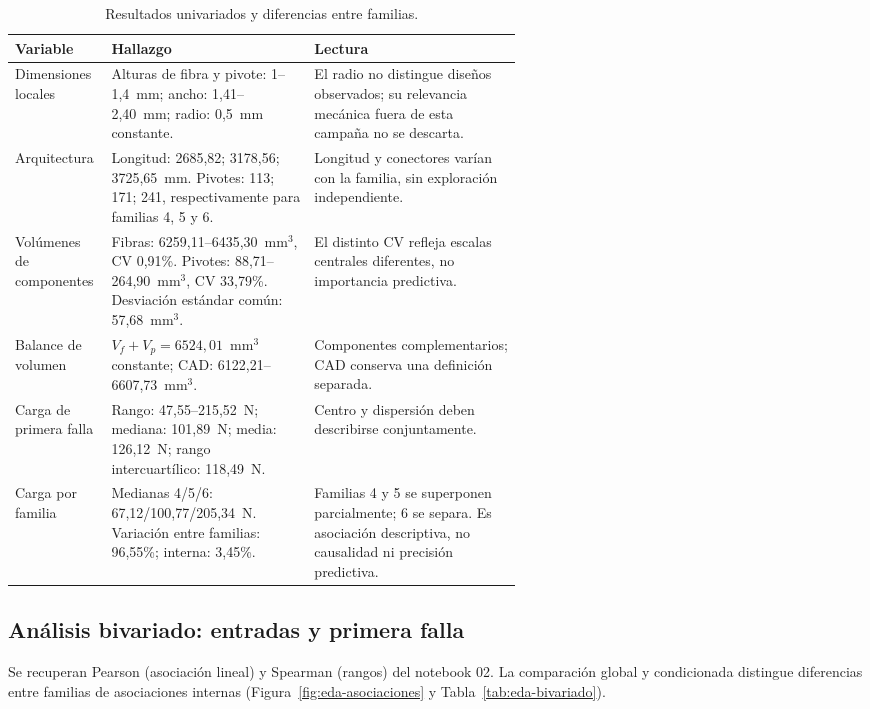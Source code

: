 \begin{table}[htbp]
\centering\small{}
\caption{Resultados univariados y diferencias entre familias.}
\label{tab:eda-univariado}
\begin{tabularx}{\linewidth}{@{}p{0.19\linewidth}p{0.40\linewidth}Y@{}}
\toprule
{} Variable & Hallazgo & Lectura \\
\midrule
Dimensiones locales & Alturas de fibra y pivote: 1--1,4~mm; ancho: 1,41--2,40~mm; radio: 0,5~mm constante. & El radio no distingue diseños observados; su relevancia mecánica fuera de esta campaña no se descarta. \\
\addlinespace
Arquitectura & Longitud: 2685,82; 3178,56; 3725,65~mm. Pivotes: 113; 171; 241, respectivamente para familias 4, 5 y 6. & Longitud y conectores varían con la familia, sin exploración independiente. \\
\addlinespace
Volúmenes de componentes & Fibras: 6259,11--6435,30~mm$^3$, CV 0,91\%. Pivotes: 88,71--264,90~mm$^3$, CV 33,79\%. Desviación estándar común: 57,68~mm$^3$. & El distinto CV refleja escalas centrales diferentes, no importancia predictiva. \\
\addlinespace
Balance de volumen & $V_f+V_p=6524{,}01$~mm$^3$ constante; CAD: 6122,21--6607,73~mm$^3$. & Componentes complementarios; CAD conserva una definición separada. \\
\addlinespace
Carga de primera falla & Rango: 47,55--215,52~N; mediana: 101,89~N; media: 126,12~N; rango intercuartílico: 118,49~N. & Centro y dispersión deben describirse conjuntamente. \\
\addlinespace
Carga por familia & Medianas 4/5/6: 67,12/100,77/205,34~N. Variación entre familias: 96,55\%; interna: 3,45\%. & Familias 4 y 5 se superponen parcialmente; 6 se separa. Es asociación descriptiva, no causalidad ni precisión predictiva. \\
\bottomrule
\end{tabularx}
\end{table}

\subsection{Análisis bivariado: entradas y primera falla}
Se recuperan Pearson (asociación lineal) y Spearman (rangos) del notebook 02. La comparación global y condicionada distingue diferencias entre familias de asociaciones internas (Figura~\ref{fig:eda-asociaciones} y Tabla~\ref{tab:eda-bivariado}).

